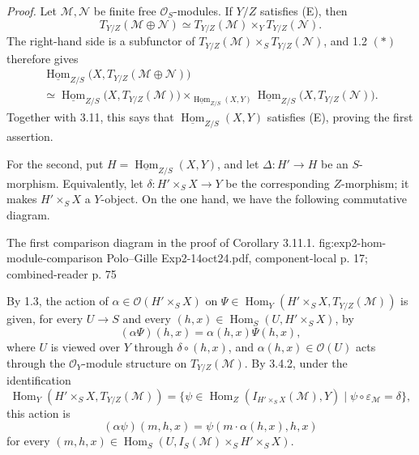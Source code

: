 \emph{Proof.}
Let \(\mathcal M,\mathcal N\) be finite free \(\mathcal O_S\)-modules.
If \(Y/Z\) satisfies (E), then
\[
  T_{Y/Z}(\mathcal M\oplus\mathcal N)
  \simeq T_{Y/Z}(\mathcal M)\times_YT_{Y/Z}(\mathcal N).
\]
The right-hand side is a subfunctor of
\(T_{Y/Z}(\mathcal M)\times_ST_{Y/Z}(\mathcal N)\), and 1.2 \((*)\)
therefore gives
\begin{multline*}
  \underline{\operatorname{Hom}}_{Z/S}
    \bigl(X,T_{Y/Z}(\mathcal M\oplus\mathcal N)\bigr)\\
  \simeq
  \underline{\operatorname{Hom}}_{Z/S}\bigl(X,T_{Y/Z}(\mathcal M)\bigr)
  \mathop{\times}_{\underline{\operatorname{Hom}}_{Z/S}(X,Y)}
  \underline{\operatorname{Hom}}_{Z/S}\bigl(X,T_{Y/Z}(\mathcal N)\bigr).
\end{multline*}
Together with 3.11, this says that
\(\underline{\operatorname{Hom}}_{Z/S}(X,Y)\) satisfies (E), proving the
first assertion.

For the second, put
\(H=\underline{\operatorname{Hom}}_{Z/S}(X,Y)\), and let
\(\Delta:H'\to H\) be an \(S\)-morphism. Equivalently, let
\(\delta:H'\times_SX\to Y\) be the corresponding \(Z\)-morphism; it
makes \(H'\times_SX\) a \(Y\)-object. On the one hand, we have the
following commutative diagram.

  {The first comparison diagram in the proof of Corollary 3.11.1.}
  {fig:exp2-hom-module-comparison}
  {Polo--Gille Exp2-14oct24.pdf, component-local p. 17; combined-reader p. 75}

By 1.3, the action of \(\alpha\in\mathcal O(H'\times_SX)\) on
\(\Psi\in\operatorname{Hom}_Y(H'\times_SX,T_{Y/Z}(\mathcal M))\) is
given, for every \(U\to S\) and every
\((h,x)\in\operatorname{Hom}_S(U,H'\times_SX)\), by
\[
  (\alpha\Psi)(h,x)=\alpha(h,x)\Psi(h,x),
\]
where \(U\) is viewed over \(Y\) through \(\delta\circ(h,x)\), and
\(\alpha(h,x)\in\mathcal O(U)\) acts through the
\(\mathcal O_Y\)-module structure on \(T_{Y/Z}(\mathcal M)\). By 3.4.2,
under the identification
\[
  \operatorname{Hom}_Y(H'\times_SX,T_{Y/Z}(\mathcal M))
  =\{\psi\in\operatorname{Hom}_Z(I_{H'\times_SX}(\mathcal M),Y)
       \mid\psi\circ\varepsilon_{\mathcal M}=\delta\},
\]
this action is
\begin{equation}
  (\alpha\psi)(m,h,x)
  =\psi(m\cdot\alpha(h,x),h,x)
  \tag{1}
\end{equation}
for every
\((m,h,x)\in\operatorname{Hom}_S
  (U,I_S(\mathcal M)\times_SH'\times_SX)\).

